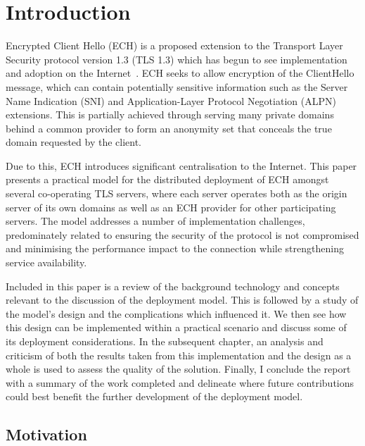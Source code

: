 \chapter{Introduction}\label{Introduction}

Encrypted Client Hello (ECH) is a proposed extension to the Transport Layer Security protocol version 1.3 (TLS 1.3) which has begun to see implementation and adoption on the Internet~\cite{ietf-tls-esni-18, tsiatsikas2022measuring, CF-ECH}. ECH seeks to allow encryption of the ClientHello message, which can contain potentially sensitive information such as the Server Name Indication (SNI) and Application-Layer Protocol Negotiation (ALPN) extensions. This is partially achieved through serving many private domains behind a common provider to form an anonymity set that conceals the true domain requested by the client.

Due to this, ECH introduces significant centralisation to the Internet. This paper presents a practical model for the distributed deployment of ECH amongst several co-operating TLS servers, where each server operates both as the origin server of its own domains as well as an ECH provider for other participating servers. The model addresses a number of implementation challenges, predominately related to ensuring the security of the protocol is not compromised and minimising the performance impact to the connection while strengthening service availability.

Included in this paper is a review of the background technology and concepts relevant to the discussion of the deployment model. This is followed by a study of the model's design and the complications which influenced it. We then see how this design can be implemented within a practical scenario and discuss some of its deployment considerations. In the subsequent chapter, an analysis and criticism of both the results taken from this implementation and the design as a whole is used to assess the quality of the solution. Finally, I conclude the report with a summary of the work completed and delineate where future contributions could best benefit the further development of the deployment model.









\section{Motivation}

